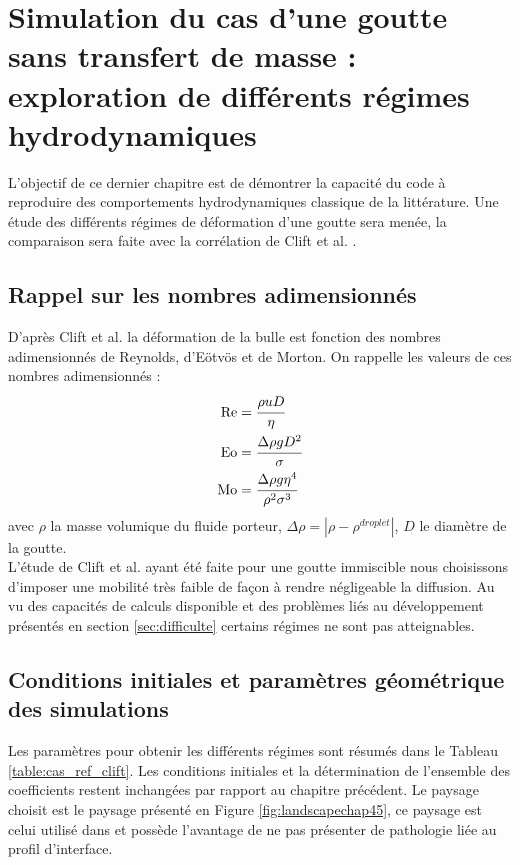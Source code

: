 \chapter{Simulation du cas d'une goutte sans transfert de masse : exploration de différents régimes hydrodynamiques}
L'objectif de ce dernier chapitre est de démontrer la capacité du code à reproduire des comportements hydrodynamiques classique de la littérature. Une étude des différents régimes de déformation d'une goutte sera menée, la comparaison sera faite avec la corrélation de Clift et al. \cite{clift_bubbles_2005}.
\section{Rappel sur les nombres adimensionnés}
D'après Clift et al. \cite{clift_bubbles_2005} la déformation de la bulle est fonction des nombres adimensionnés de Reynolds, d'Eötvös et de Morton. On rappelle les valeurs de ces nombres adimensionnés : 
\begin{align}
\text{Re} &= \cfrac{\rho u D}{\eta}\\
\text{Eo} &= \cfrac{\Delta \rho g D^2}{\sigma}\\
\text{Mo} &= \cfrac{\Delta \rho g \eta^4}{\rho^2 \sigma^3}
\end{align}
avec $\rho$ la masse volumique du fluide porteur, $\Delta\rho = |\rho - \rho^{droplet}|$, $D$ le diamètre de la goutte. \\
L'étude de Clift et al. ayant été faite pour une goutte immiscible nous choisissons d'imposer une mobilité très faible de façon à rendre négligeable la diffusion.
Au vu des capacités de calculs disponible et des problèmes liés au développement présentés en section \ref{sec:difficulte} certains régimes ne sont pas atteignables.

\section{Conditions initiales et paramètres géométrique des simulations}
Les paramètres pour obtenir les différents régimes sont résumés dans le Tableau \ref{table:cas_ref_clift}. Les conditions initiales et la détermination de l'ensemble des coefficients restent inchangées par rapport au chapitre précédent. Le paysage choisit est le paysage présenté en Figure \ref{fig:landscapechap45}, ce paysage est celui utilisé dans \cite{rasolofomanana_numerical_nodate} et possède l'avantage de ne pas présenter de pathologie liée au profil d'interface.


